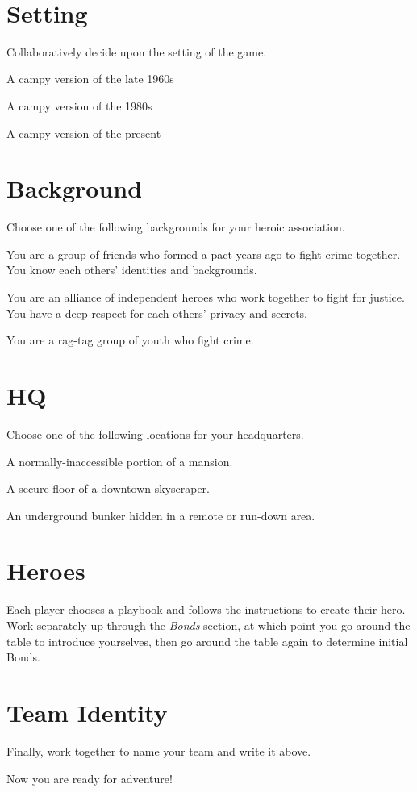 \documentclass{article}
\begin{document}
\\

\section*{Setting}
Collaboratively decide upon the setting of the game.
\begin{chooseone}
\item A campy version of the late 1960s
\item A campy version of the 1980s
\item A campy version of the present
\end{chooseone}

\section*{Background}
Choose one of the following backgrounds for your
 heroic association.
 \begin{chooseone}
 \item You are a group of friends who formed a pact years ago
   to fight crime together. You know each others' identities
   and backgrounds.
 \item You are an alliance of independent heroes who work
   together to fight for justice. You have a deep respect for each
   others' privacy and secrets.
 \item You are a rag-tag group of youth who fight crime.
 \end{chooseone}


\section*{HQ}
Choose one of the following locations for your headquarters.
\begin{chooseone}
\item A normally-inaccessible portion of a mansion.
\item A secure floor of a downtown skyscraper.
\item An underground bunker hidden in a remote or run-down area.
\end{chooseone}

\section*{Heroes}
Each player chooses a playbook and follows the instructions to
create their hero. Work separately up through the \emph{Bonds}
section, at which point you go around the table to introduce yourselves,
then go around the table again to determine initial Bonds.

\section*{Team Identity}
Finally, work together to name your team and write it above.

Now you are ready for adventure!
\end{document}
